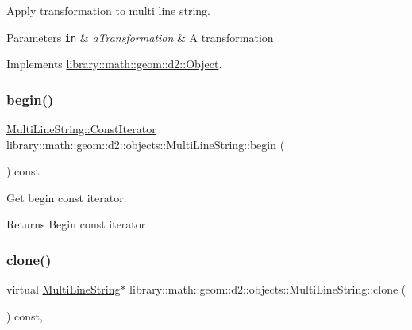 Apply transformation to multi line string. 


\begin{DoxyParams}[1]{Parameters}
\mbox{\tt in}  & {\em a\+Transformation} & A transformation \\
\hline
\end{DoxyParams}


Implements \hyperlink{classlibrary_1_1math_1_1geom_1_1d2_1_1_object_a289589fb6e9e7a2c4ca4976a1544def5}{library\+::math\+::geom\+::d2\+::\+Object}.

\mbox{\label{classlibrary_1_1math_1_1geom_1_1d2_1_1objects_1_1_multi_line_string_a4fe1cbb1f12f2ea9f84189db37e6d0c6}} 
\subsubsection{\texorpdfstring{begin()}{begin()}}
{\footnotesize\ttfamily \hyperlink{classlibrary_1_1math_1_1geom_1_1d2_1_1objects_1_1_multi_line_string_ae9d86dd3f4a78f03347ada9781158b85}{Multi\+Line\+String\+::\+Const\+Iterator} library\+::math\+::geom\+::d2\+::objects\+::\+Multi\+Line\+String\+::begin (\begin{DoxyParamCaption}{ }\end{DoxyParamCaption}) const}



Get begin const iterator. 

\begin{DoxyReturn}{Returns}
Begin const iterator 
\end{DoxyReturn}
\mbox{\label{classlibrary_1_1math_1_1geom_1_1d2_1_1objects_1_1_multi_line_string_a38054f0f0a2c198b5d3c76ef22562e30}} 
\subsubsection{\texorpdfstring{clone()}{clone()}}
{\footnotesize\ttfamily virtual \hyperlink{classlibrary_1_1math_1_1geom_1_1d2_1_1objects_1_1_multi_line_string}{Multi\+Line\+String}$\ast$ library\+::math\+::geom\+::d2\+::objects\+::\+Multi\+Line\+String\+::clone (\begin{DoxyParamCaption}{ }\end{DoxyParamCaption}) const\hspace{0.3cm}{\ttfamily [override]}, {\ttfamily [virtual]}}



